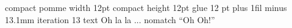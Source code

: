 \def\getoptspec@L{%
  \flagfalse
  \def\rmN{\getoptspec@E}%
  \getoptspec@A\getoptspecunit\getoptspec@U
  \getoptspec@A\getoptspecmandatory\getoptspec@V
  \getoptspec@A\getoptspecoptional\getoptspec@O
  \rmN
}

\def\getoptspec@E{%
  \edef\next{\the\rtD{\the\rtA}\the\rtB}%
  \endnext
}

\def\getoptspec@U#1{%
  \toksrappend#1\to\rtA
  \getoptspec@M
}

\def\getoptspec@V#1{\getoptspec@W#1}

\def\getoptspec@W#1#2{%
  \toksrappend#1\to\rtA
  #2%
}



\def\getoptspecunit{%
  \\{{compact}{\test@compact}}%
}

\def\getoptspecmandatory{%
  \\{{width}{{\test@width}{\getoptspecdimen}}}%
  \\{{height}{{\test@height}{\getoptspecdimen}}}%
  \\{{depth}{{\test@depth}{\getoptspecdimen}}}%
  \\{{glue}{{\test@glue}{\getoptspecskip}}}%
  \\{{text}{{\test@text}{\getoptspectoks}}}%
  \\{{iteration}{{\test@iteration}{\getoptspeccount}}}%
}%

\def\getoptspecoptional{%
  \\{{star}{\test@star}}%
}%

\getoptspec\showtoks compact pomme
\getoptspec\showtoks
 width 12pt
 compact
 height 12pt
 glue 12 pt plus 1fil minus 13.1mm
 iteration 13
 text {Oh la la ...}%
\getoptspec\showtoks nomatch ``Oh Oh!''

\bye
